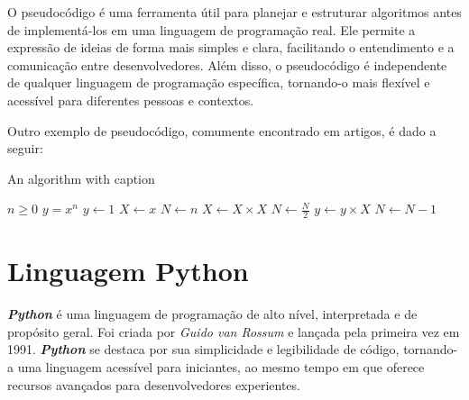 \documentclass[a4paper, 12pt, onecolumn,singlespacing]{article}
\begin{document}
	O pseudocódigo é uma ferramenta útil para planejar e estruturar algoritmos antes de implementá-los em uma linguagem de programação real. Ele permite a expressão de ideias de forma mais simples e clara, facilitando o entendimento e a comunicação entre desenvolvedores. Além disso, o pseudocódigo é independente de qualquer linguagem de programação específica, tornando-o mais flexível e acessível para diferentes pessoas e contextos.
	
	Outro exemplo de pseudocódigo, comumente encontrado em artigos, é dado a seguir:
		
	\begin{algorithm}
		\caption{An algorithm with caption}\label{alg:cap}
		\begin{algorithmic}
			\Require $n \geq 0$
			\Ensure $y = x^n$
			\State $y \gets 1$
			\State $X \gets x$
			\State $N \gets n$
			\State $X \gets X \times X$
			\State $N \gets \frac{N}{2}$  
			\State $y \gets y \times X$
			\State $N \gets N - 1$
			\EndIf
			\EndWhile
		\end{algorithmic}
	\end{algorithm}
	
	
	\section{Linguagem Python}
	\label{linguagem_python}
	\textbf{\textit{Python}} é uma linguagem de programação de alto nível, interpretada e de propósito geral. Foi criada por \textit{Guido van Rossum} e lançada pela primeira vez em 1991. \textbf{\textit{Python}} se destaca por sua simplicidade e legibilidade de código, tornando-a uma linguagem acessível para iniciantes, ao mesmo tempo em que oferece recursos avançados para desenvolvedores experientes.
	
\end{document}

